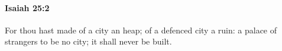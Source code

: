 
		\paragraph{Isaiah 25:2} %
			\label{ISAIAH-25-2}

			For thou hast made of a city an heap; of a defenced city a ruin: a palace of strangers to be no city; it shall never be built.


